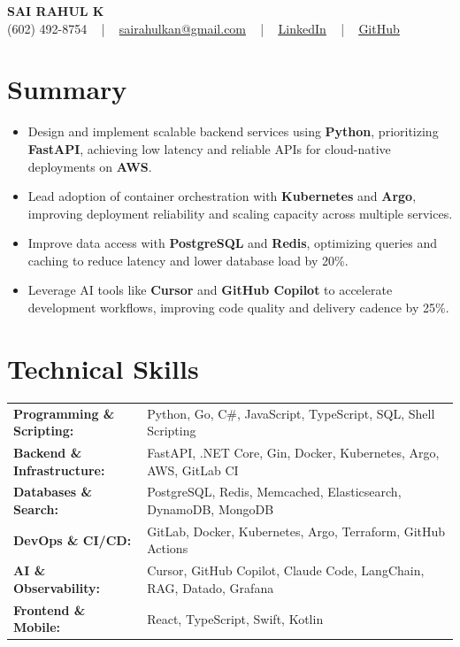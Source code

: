 \documentclass[letterpaper,11pt]{article}
\newcommand{\resumeItem}[1]{
  \item\footnotesize{
    {#1 \vspace{-2pt}}
  }
}
\newcommand{\resumeItemListStart}{\begin{itemize}[leftmargin=*]}
\newcommand{\resumeItemListEnd}{\end{itemize}\vspace{-5pt}}
\begin{document}
\begin{center}
    {\fontsize{14pt}{12pt}\selectfont \textbf{\MakeUppercase{Sai Rahul K}}}\\ \vspace{2pt}
    \fontsize{10pt}{12pt}\selectfont (602) 492-8754 ~ | ~ \href{mailto:sairahulkan@gmail.com}{sairahulkan@gmail.com} ~ | ~
    \href{https://www.linkedin.com/in/rq123/}{\color{blue}\underline{LinkedIn}} ~ | ~
    \href{https://github.com/kanrahuldo}{\color{blue}\underline{GitHub}}~
    \vspace{-8pt}
\end{center}

\section{Summary}
\fontsize{9pt}{10pt}\selectfont
\resumeItemListStart
    \resumeItem{Design and implement scalable backend services using \textbf{Python}, prioritizing \textbf{FastAPI}, achieving low latency and reliable APIs for cloud-native deployments on \textbf{AWS}.}
    \resumeItem{Lead adoption of container orchestration with \textbf{Kubernetes} and \textbf{Argo}, improving deployment reliability and scaling capacity across multiple services.}
    \resumeItem{Improve data access with \textbf{PostgreSQL} and \textbf{Redis}, optimizing queries and caching to reduce latency and lower database load by 20\%.}
    \resumeItem{Leverage AI tools like \textbf{Cursor} and \textbf{GitHub Copilot} to accelerate development workflows, improving code quality and delivery cadence by 25\%.}
\resumeItemListEnd
\vspace{-6pt}

\section{Technical Skills}
        \vspace{-14pt}
        \begin{table}[h]
            \fontsize{9pt}{10pt}\selectfont
            \begin{tabular}{p{0.3\linewidth} p{0.7\linewidth}}
                \textbf{Programming \& Scripting:} & Python, Go, C\#, JavaScript, TypeScript, SQL, Shell Scripting \\
                \textbf{Backend \& Infrastructure:} & FastAPI, .NET Core, Gin, Docker, Kubernetes, Argo, AWS, GitLab CI \\
                \textbf{Databases \& Search:} & PostgreSQL, Redis, Memcached, Elasticsearch, DynamoDB, MongoDB \\
                \textbf{DevOps \& CI/CD:} & GitLab, Docker, Kubernetes, Argo, Terraform, GitHub Actions \\
                \textbf{AI \& Observability:} & Cursor, GitHub Copilot, Claude Code, LangChain, RAG, Datado, Grafana \\
                \textbf{Frontend \& Mobile:} & React, TypeScript, Swift, Kotlin \\
            \end{tabular}
        \end{table}
    \vspace{-15pt}
\end{document}
